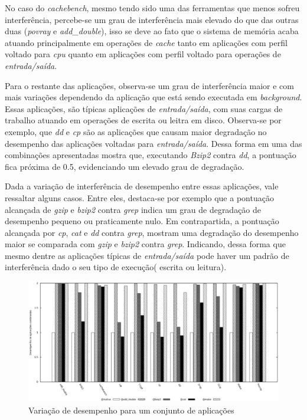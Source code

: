 No caso do \textit{cachebench}, mesmo tendo sido uma das ferramentas que menos sofreu interferência, percebe-se um grau de interferência mais elevado do que das outras duas (\textit{povray} e \textit{add\_double}), isso se deve ao fato que o sistema de memória acaba atuando principalmente em operações de \textit{cache} tanto em aplicações com perfil voltado para \textit{cpu} quanto em aplicações com perfil voltado para operações de \textit{entrada/saída}.

Para o restante das aplicações, observa-se um grau de interferência maior e com mais variações dependendo da aplicação que está sendo executada em \textit{background}. Essas aplicações, são típicas aplicações de \textit{entrada/saída}, com suas cargas de trabalho atuando em operações de escrita ou leitra em disco. Observa-se por exemplo, que \textit{dd} e \textit{cp} são as aplicações que causam maior degradação no desempenho das aplicações voltadas para \textit{entrada/saída}. Dessa forma  em uma das combinações apresentadas mostra que, executando \textit{Bzip2} contra \textit{dd}, a pontuação fica próxima de 0.5, evidenciando um elevado grau de degradação.

Dada a variação de interferência de desempenho entre essas aplicações, vale ressaltar alguns casos. Entre eles, destaca-se por exemplo que a pontuação alcançada de \textit{gzip} e \textit{bzip2} contra \textit{grep} indica um grau de degradação de desempenho pequeno ou praticamente nulo. Em contrapartida, a pontuação alcançada por \textit{cp}, \textit{cat} e \textit{dd} contra \textit{grep}, mostram uma degradação do desempenho maior se comparada com \textit{gzip} e \textit{bzip2} contra \textit{grep}. Indicando, dessa forma que mesmo dentre as aplicações típicas de \textit{entrada/saída} pode haver um padrão de interferência dado o seu tipo de execução( escrita ou leitura). 

\begin{figure}[!h]
\centering
\includegraphics [keepaspectratio=true,scale=0.5]{graficos/exp2_1.eps}
\caption{Variação de desempenho para um conjunto de aplicações}
\label{second_experiment_second}
\end{figure} 

